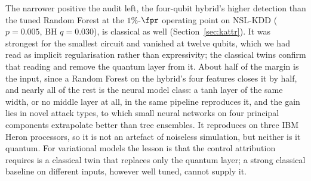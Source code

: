 The narrower positive the audit left, the four-qubit hybrid's higher detection than the tuned Random
Forest at the $1\%$-$\fpr$ operating point on NSL-KDD ($p=0.005$, BH $q=0.030$), is classical as well
(Section~\ref{sec:kattr}). It was strongest for the smallest circuit and vanished at twelve qubits, which
we had read as implicit regularisation rather than expressivity; the classical twins confirm that reading
and remove the quantum layer from it. About half of the margin is the input, since a Random Forest on the
hybrid's four features closes it by half, and nearly all of the rest is the neural model class: a tanh
layer of the same width, or no middle layer at all, in the same pipeline reproduces it, and the gain lies
in novel attack types, to which small neural networks on four principal components extrapolate better
than tree ensembles. It reproduces on three IBM Heron processors, so it is not an artefact of noiseless
simulation, but neither is it quantum. For variational models the lesson is that the control attribution
requires is a classical twin that replaces only the quantum layer; a strong classical baseline on
different inputs, however well tuned, cannot supply it.
